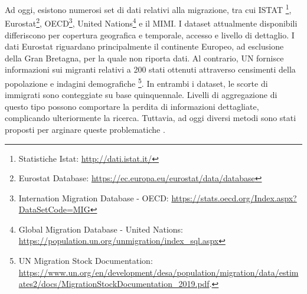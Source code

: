 Ad oggi, esistono numerosi set di dati relativi alla migrazione, tra cui ISTAT \footnote{Statistiche Istat: \url{http://dati.istat.it/}}, Eurostat\footnote{Eurostat Database: \url{https://ec.europa.eu/eurostat/data/database}}, OECD\footnote{Internation Migration Database - OECD: \url{https://stats.oecd.org/Index.aspx?DataSetCode=MIG}}, United Nations\footnote{Global Migration Database - United Nations: \url{https://population.un.org/unmigration/index_sql.aspx}} e il MIMI. I dataset attualmente disponibili differiscono per copertura geografica e  temporale, accesso e livello di dettaglio.  I dati Eurostat riguardano principalmente il continente Europeo, ad esclusione della Gran Bretagna, per la quale non riporta dati. Al contrario, UN fornisce informazioni sui migranti relativi a 200 stati ottenuti attraverso censimenti della popolazione e indagini demografiche \footnote{UN Migration Stock Documentation: \url{https://www.un.org/en/development/desa/population/migration/data/estimates2/docs/MigrationStockDocumentation_2019.pdf}.}.
In entrambi i dataset, le scorte di immigrati sono conteggiate su base quinquennale.  Livelli di aggregazione di questo tipo possono comportare la perdita di informazioni dettagliate, complicando ulteriormente la ricerca. Tuttavia, ad oggi diversi metodi sono stati proposti per arginare queste problematiche \cite{intmigunderthemicro}. 

